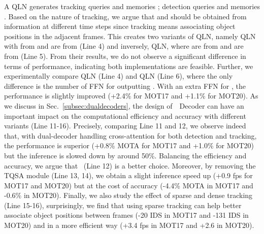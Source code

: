 \begin{table}[ht]
A QLN generates tracking queries  and memories ; detection queries  and memories . Based on the nature of tracking, we argue that  and  should be obtained from information at different time steps since tracking means associating object positions in the adjacent frames. This creates two variants of QLN, namely QLN with  from  and  are from  (Line 4) and inversely, QLN, where  are from  and  are from  (Line 5). From their results, we do not observe a significant difference in terms of performance, indicating both implementations are feasible. Further, we experimentally compare QLN (Line 4) and QLN (Line 6), where the only difference is the number of FFN for outputting . With an extra FFN for , the performance is slightly improved (+2.4\% for MOT17 and +1.1\% for MOT20).
 As we discuss in Sec.~\ref{subsec:dualdecoders}, the design of~\method\ Decoder can have an important impact on the computational efficiency and accuracy with different variants (Line 11-16). Precisely, comparing Line 11 and 12, we observe indeed that, with dual-decoder handling cross-attention for both detection and tracking, the performance is superior (+0.8\% MOTA for MOT17 and +1.0\% for MOT20) but the inference is slowed down by around 50\%. Balancing the efficiency and accuracy, we argue that \method\ (Line 12) is a better choice. Moreover, by removing the TQSA module (Line 13, 14), we obtain a slight inference speed up (+0.9 fps for MOT17 and MOT20) but at the cost of accuracy (-4.4\% MOTA in MOT17 and -0.6\% in MOT20). Finally, we also study the effect of sparse and dense tracking (Line 15-16), surprisingly, we find that using sparse tracking can help better associate object positions between frames  (-20 IDS in MOT17 and -131 IDS in MOT20) and in a more efficient way (+3.4 fps in MOT17 and +2.6 in MOT20).

\end{table}
